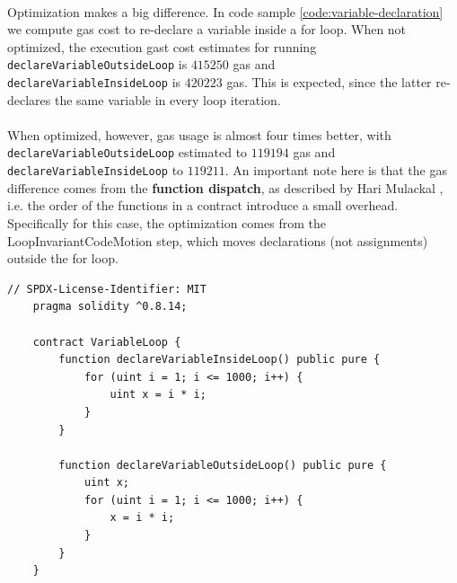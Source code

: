 





\paragraph*{}
Optimization makes a big difference. In code sample \ref{code:variable-declaration} we compute gas cost to re-declare a variable inside a for loop. When not optimized, the execution gast cost estimates for running \lstinline[language=Solidity]{declareVariableOutsideLoop} is $415250$ gas and \\ \lstinline[language=Solidity]{declareVariableInsideLoop} is $420223$ gas. This is expected, since the latter re-declares the same variable in every loop iteration.

\paragraph*{}
When optimized, however, gas usage is almost four times better, with \\ \lstinline[columns=fixed, language=Solidity]{declareVariableOutsideLoop} estimated to $119194$ gas and \lstinline[columns=fixed, language=Solidity]{declareVariableInsideLoop} to $119211$. An important note here is that the gas difference comes from the \textbf{function dispatch}, as described by Hari Mulackal \cite{hari-gas-dispatch}, i.e. the order of the functions in a contract introduce a small overhead. Specifically for this case, the optimization comes from the LoopInvariantCodeMotion step, which moves declarations (not assignments) outside the for loop.


\label{code:variable-declaration}
\begin{lstlisting}[language=Solidity, caption=Code example of bad variable declaration inside a for loop]
    // SPDX-License-Identifier: MIT
    pragma solidity ^0.8.14;

    contract VariableLoop {
        function declareVariableInsideLoop() public pure {
            for (uint i = 1; i <= 1000; i++) {
                uint x = i * i;
            }
        }

        function declareVariableOutsideLoop() public pure {
            uint x;
            for (uint i = 1; i <= 1000; i++) {
                x = i * i;
            }
        }
    }
\end{lstlisting}

